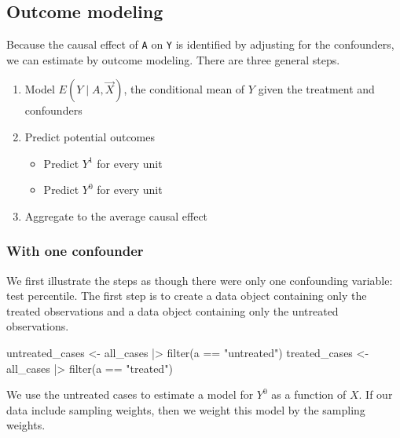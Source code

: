\documentclass[
  letterpaper,
  DIV=11,
  numbers=noendperiod]{scrartcl}
\newenvironment{Shaded}{\begin{snugshade}}{\end{snugshade}}
\newcommand{\FunctionTok}[1]{\textcolor[rgb]{0.28,0.35,0.67}{#1}}
\newcommand{\NormalTok}[1]{\textcolor[rgb]{0.00,0.23,0.31}{#1}}
\newcommand{\OtherTok}[1]{\textcolor[rgb]{0.00,0.23,0.31}{#1}}
\newcommand{\SpecialCharTok}[1]{\textcolor[rgb]{0.37,0.37,0.37}{#1}}
\newcommand{\StringTok}[1]{\textcolor[rgb]{0.13,0.47,0.30}{#1}}
\providecommand{\tightlist}{%
  \setlength{\itemsep}{0pt}\setlength{\parskip}{0pt}}\usepackage{longtable,booktabs,array}
\begin{document}
\subsection{Outcome modeling}\label{outcome-modeling}

Because the causal effect of \texttt{A} on \texttt{Y} is identified by
adjusting for the confounders, we can estimate by outcome modeling.
There are three general steps.

\begin{enumerate}
\def\labelenumi{\arabic{enumi})}
\tightlist
\item
  Model \(E(Y\mid A, \vec{X})\), the conditional mean of \(Y\) given the
  treatment and confounders
\item
  Predict potential outcomes

  \begin{itemize}
  \tightlist
  \item
    Predict \(Y^1\) for every unit
  \item
    Predict \(Y^0\) for every unit
  \end{itemize}
\item
  Aggregate to the average causal effect
\end{enumerate}

\subsubsection{With one confounder}\label{with-one-confounder}

We first illustrate the steps as though there were only one confounding
variable: test percentile. The first step is to create a data object
containing only the treated observations and a data object containing
only the untreated observations.

\begin{Shaded}
\begin{Highlighting}[]
\NormalTok{untreated\_cases }\OtherTok{\textless{}{-}}\NormalTok{ all\_cases }\SpecialCharTok{|\textgreater{}} \FunctionTok{filter}\NormalTok{(a }\SpecialCharTok{==} \StringTok{"untreated"}\NormalTok{)}
\NormalTok{treated\_cases }\OtherTok{\textless{}{-}}\NormalTok{ all\_cases }\SpecialCharTok{|\textgreater{}} \FunctionTok{filter}\NormalTok{(a }\SpecialCharTok{==} \StringTok{"treated"}\NormalTok{)}
\end{Highlighting}
\end{Shaded}

We use the untreated cases to estimate a model for \(Y^0\) as a function
of \(X\). If our data include sampling weights, then we weight this
model by the sampling weights.
\end{document}
